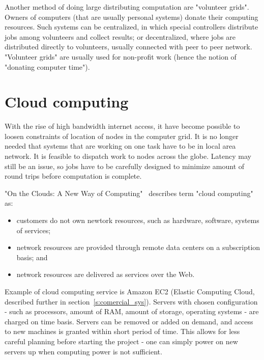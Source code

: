 Another method of doing large distributing computation are "volunteer grids". Owners of computers (that are usually personal systems) donate their computing resources. Such systems can be centralized, in which special controllers distribute jobs among volunteers and collect results; or decentralized, where jobs are distributed directly to volunteers, usually connected with peer to peer network. "Volunteer grids" are usually used for non-profit work (hence the notion of "donating computer time").

\section{Cloud computing}

With the rise of high bandwidth internet access, it have become possible to loosen constraints of location of nodes in the computer grid. It is no longer needed that systems that are working on one task have to be in local area network. It is feasible to dispatch work to nodes across the globe. Latency may still be an issue, so jobs have to be carefully designed to minimize amount of round trips before computation is complete.

\begin{comment}
Han-OnTheClouds-2010.pdf
\end{comment}

"On the Clouds: A New Way of Computing"~\cite{han2013clouds} describes term "cloud computing" as:
\begin{itemize}
\item customers do not own newtork resources, such as hardware, software, systems of services;
\item network resources are provided through remote data centers on a subscription basis; and
\item network resources are delivered as services over the Web.
\end{itemize}

Example of cloud computing service is Amazon EC2 (Elastic Computing Cloud, described further in section~\ref{s:comercial_sys}). Servers with chosen configuration - such as processors, amount of RAM, amount of storage, operating systems - are charged on time basis. Servers can be removed or added on demand, and access to new machines is granted within short period of time. This allows for less careful planning before starting the project - one can simply power on new servers up when computing power is not sufficient.

